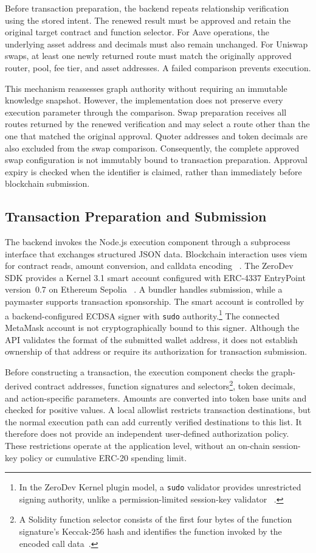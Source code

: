 Before transaction preparation, the backend repeats
relationship verification using the stored intent.
The renewed result must be approved and retain the
original target contract and function selector.
For Aave operations, the underlying asset address and
decimals must also remain unchanged. For Uniswap swaps,
at least one newly returned route must match the
originally approved router, pool, fee tier, and
asset addresses. A failed comparison prevents execution.


This mechanism reassesses graph authority without
requiring an immutable knowledge snapshot. However,
the implementation does not preserve every execution
parameter through the comparison. Swap preparation
receives all routes returned by the renewed verification
and may select a route other than the one that matched
the original approval. Quoter addresses and token decimals
are also excluded from the swap comparison. Consequently,
the complete approved swap configuration is not
immutably bound to transaction preparation. Approval
expiry is checked when the identifier is claimed,
rather than immediately before blockchain submission.


\subsection{Transaction Preparation and Submission}

The backend invokes the Node.js execution component
through a subprocess interface that exchanges structured
JSON data. Blockchain interaction uses viem for contract
reads, amount conversion, and calldata encoding
~\cite{implViem}. The ZeroDev SDK provides a Kernel
3.1 smart account configured with ERC-4337 EntryPoint
version~0.7 on Ethereum Sepolia
~\cite{implZeroDevSDK,implERC4337}. A bundler handles
submission, while a paymaster supports transaction
sponsorship. The smart account is controlled by a backend-configured
ECDSA signer with \texttt{sudo} authority.\footnote{In
the ZeroDev Kernel plugin model, a \texttt{sudo}
validator provides unrestricted signing authority,
unlike a permission-limited session-key validator
~\cite{implZeroDevPlugins}.}
The connected MetaMask account is not cryptographically
bound to this signer. Although the API validates the
format of the submitted wallet address, it does not
establish ownership of that address or require its
authorization for transaction submission.

Before constructing a transaction, the execution
component checks the graph-derived contract addresses,
function signatures and selectors\footnote{A Solidity
function selector consists of the first four bytes
of the function signature's Keccak-256 hash and
identifies the function invoked by the encoded
call data~\cite{implSolidityABI}.}, token decimals,
and action-specific parameters. Amounts are converted
into token base units and checked for positive values.
A local allowlist restricts transaction destinations,
but the normal execution path can add currently
verified destinations to this list. It therefore
does not provide an independent user-defined
authorization policy. These restrictions operate
at the application level, without an on-chain
session-key policy or cumulative ERC-20 spending limit.


